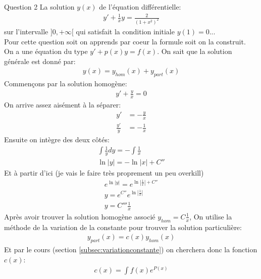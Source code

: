\begin{parag}{Question 2}
    La solution $y\left(x\right)$ de l'équation différentielle:
    \begin{align*} y' + \frac{1}{x}y = \frac{2}{\left(1 + x^2\right)^2} \end{align*}
    sur l'intervalle $] 0, + \infty [$ qui satisfait la condition initiale $y\left(1\right) = 0$...\\
    Pour cette question soit on apprends par coeur la formule soit on la construit.\\
    On a une équation du type $y' + p\left(x\right)y = f\left(x\right)$. On sait que la solution générale est donné par:
    \begin{align*} y\left(x\right) = y_{hom}\left(x\right) + y_{part}\left(x\right) \end{align*}
    Commençons par la solution homogène:
    \begin{align*} y' + \frac{y}{x} = 0 \end{align*}
    On arrive assez aisément à la séparer:
    \begin{align*} y' &= -\frac{y}{x}\\
    \frac{y'}{y} &= -\frac{1}{x}\end{align*}
    Ensuite on intègre des deux côtés:
    \begin{align*} \int \frac{1}{y} dy = - \int \frac{1}{x}\\
        \ln \left|y\right| = - \ln \left|x\right| + C''
    \end{align*}
    Et à partir d'ici (je vais le faire très proprement un peu overkill)
    \begin{align*} e^{\ln \left|y\right|} = e^{ \ln \left|\frac{1}{x}\right| + C''}\\
        y = e^{C''}e^{\ln \left|\frac{1}{x}\right|}\\
        y = C'''\frac{1}{x}
    \end{align*}
    Après avoir trouver la solution homogène associé $y_{hom} = C\frac{1}{x}$, On utilise la méthode de la variation de la constante pour trouver la solution particulière:
\begin{align*} y_{part}\left(x\right) = c\left(x\right)y_{hom}\left(x\right) \end{align*}
Et par le cours (section \ref{subsec:variationconstante}) on cherchera donc la fonction $c\left(x\right)$:
\begin{align*}c\left(x\right) = \int f\left(x\right) e^{P\left(x\right)}  \end{align*}

\end{parag}
